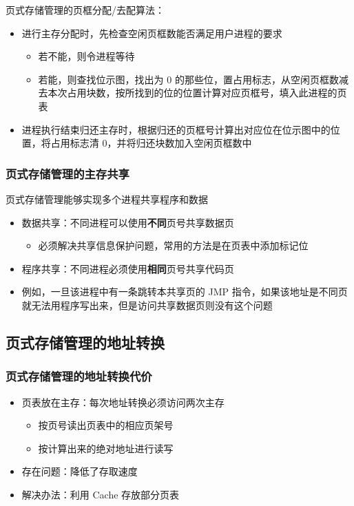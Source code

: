 \documentclass[cs4size,a4paper,10pt]{ctexart}
\begin{document}
		页式存储管理的页框分配/去配算法：
		\begin{itemize}
			\item 进行主存分配时，先检查空闲页框数能否满足用户进程的要求
			\begin{itemize}
				\item 若不能，则令进程等待
				\item 若能，则查找位示图，找出为 0 的那些位，置占用标志，从空闲页框数减去本次占用块数，按所找到的位的位置计算对应页框号，填入此进程的页表
			\end{itemize}
			\item 进程执行结束归还主存时，根据归还的页框号计算出对应位在位示图中的位置，将占用标志清 0，并将归还块数加入空闲页框数中
		\end{itemize}

		\subsubsection{页式存储管理的主存共享}
		页式存储管理能够实现多个进程共享程序和数据
		\begin{itemize}
			\item 数据共享：不同进程可以使用\textbf{不同}页号共享数据页
			\begin{itemize}
				\item 必须解决共享信息保护问题，常用的方法是在页表中添加标记位
			\end{itemize}
			\item 程序共享：不同进程必须使用\textbf{相同}页号共享代码页
			\item 例如，一旦该进程中有一条跳转本共享页的 JMP 指令，如果该地址是不同页就无法用程序写出来，但是访问共享数据页则没有这个问题
		\end{itemize}


		\subsection{页式存储管理的地址转换}
		\subsubsection{页式存储管理的地址转换代价}
		\begin{itemize}
			\item 页表放在主存：每次地址转换必须访问两次主存
			\begin{itemize}
				\item 按页号读出页表中的相应页架号
				\item 按计算出来的绝对地址进行读写
			\end{itemize}
			\item 存在问题：降低了存取速度
			\item 解决办法：利用 Cache 存放部分页表
		\end{itemize}
\end{document}
